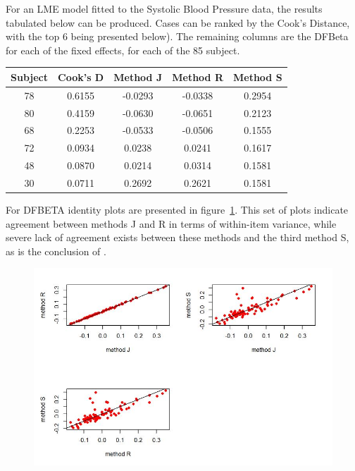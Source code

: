 \documentclass[12pt, a4paper]{report}
\theoremstyle{plain}
\theoremstyle{definition}
\theoremstyle{remark}
\begin{document}
	
For an LME model fitted to the Systolic Blood Pressure data, the results tabulated below can be produced.  Cases can be ranked by the Cook's Distance, with the top 6 being presented below). The remaining columns are the DFBeta for each of the fixed effects, for each of the 85 subject.
\begin{center}
\begin{tabular}{|c|c|c|c|c|} \hline
			Subject &    Cook's D  &    Method J  &   Method R  & Method S \\ \hline \hline
			78 & 0.6155 & -0.0293 & -0.0338 & 0.2954  \\ \hline
			80 & 0.4159 & -0.0630 & -0.0651 & 0.2123  \\ \hline
			68 & 0.2253 & -0.0533 & -0.0506 & 0.1555  \\ \hline
			72 & 0.0934  & 0.0238  & 0.0241 & 0.1617  \\ \hline
			48 & 0.0870  & 0.0214  & 0.0314 & 0.1581  \\ \hline
			30 & 0.0711  & 0.2692  & 0.2621 & 0.1581  \\ \hline
\end{tabular}
\end{center}
For DFBETA identity plots are presented in figure~\ref{fig:04-DFbetaplots}. This set of plots indicate agreement between methods J and R in terms of within-item variance, while severe lack of agreement exists between these methods and the third method S, as is the conclusion of \citet{ARoy2009}.	
	\begin{figure}[h!]
		\centering
		\includegraphics[width=1.1\linewidth]{images/04-DFbetaplots}
\label{fig:04-DFbetaplots}
	\end{figure}
	
\end{document}
